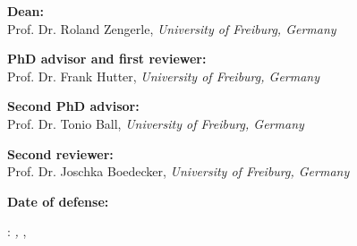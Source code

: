 \thispagestyle{empty}

\hfill

\vfill


  \begin{flushleft}
    \noindent
    \textbf{Dean:}\\
    Prof. Dr. Roland Zengerle, \emph{University of Freiburg, Germany}\\

    \bigskip

    \noindent
    \textbf{PhD advisor and first reviewer:}\\
    Prof. Dr. Frank Hutter, \emph{University of Freiburg, Germany}\\

    \bigskip

    \noindent
    \textbf{Second PhD advisor:}\\
    Prof. Dr. Tonio Ball,  \emph{University of Freiburg, Germany}\\

    \bigskip

    \noindent
    \textbf{Second reviewer:}\\
    Prof. Dr. Joschka Boedecker,  \emph{University of Freiburg, Germany}\\

    \bigskip

    \noindent
    \textbf{Date of defense:}\\
    \phantom{TBD}

\noindent\myName: \textit{\myTitle,} \mySubtitle, %
\textcopyright\ \myTime


    

  \end{flushleft}

%
%
%
%
%
